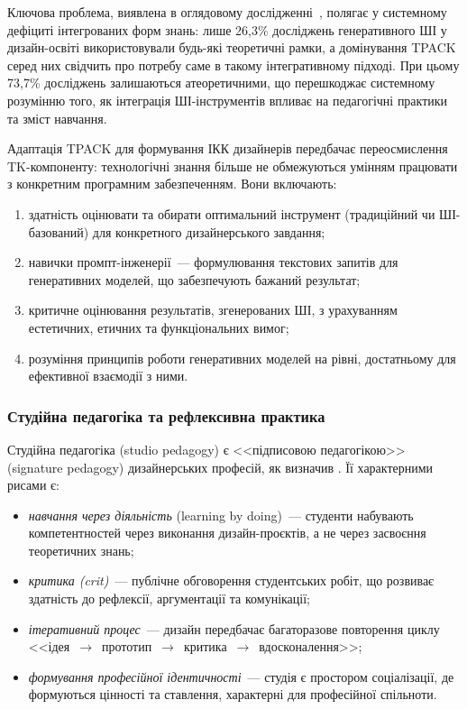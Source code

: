 Ключова проблема, виявлена в оглядовому дослідженні~\cite{Musiienko2026ScopingReview}, полягає у системному дефіциті інтегрованих форм знань: лише 26,3\% досліджень генеративного ШІ у дизайн-освіті використовували будь-які теоретичні рамки, а домінування TPACK серед них свідчить про потребу саме в такому інтегративному підході. При цьому 73,7\% досліджень залишаються атеоретичними, що перешкоджає системному розумінню того, як інтеграція ШІ-інструментів впливає на педагогічні практики та зміст навчання.

Адаптація TPACK для формування ІКК дизайнерів передбачає переосмислення TK-компоненту: технологічні знання більше не обмежуються умінням працювати з конкретним програмним забезпеченням. Вони включають:
\begin{enumerate}
    \item здатність оцінювати та обирати оптимальний інструмент (традиційний чи ШІ-базований) для конкретного дизайнерського завдання;
    \item навички промпт-інженерії~--- формулювання текстових запитів для генеративних моделей, що забезпечують бажаний результат;
    \item критичне оцінювання результатів, згенерованих ШІ, з урахуванням естетичних, етичних та функціональних вимог;
    \item розуміння принципів роботи генеративних моделей на рівні, достатньому для ефективної взаємодії з ними.
\end{enumerate}

\subsubsection{Студійна педагогіка та рефлексивна практика}\label{sssec:1.4.2}

Студійна педагогіка (studio pedagogy) є <<підписовою педагогікою>> (signature pedagogy) дизайнерських професій, як визначив \citet{Shulman2005}. Її характерними рисами є:

\begin{itemize}
    \item \textit{навчання через діяльність} (learning by doing)~--- студенти набувають компетентностей через виконання дизайн-проєктів, а не через засвоєння теоретичних знань;
    \item \textit{критика (crit)}~--- публічне обговорення студентських робіт, що розвиває здатність до рефлексії, аргументації та комунікації;
    \item \textit{ітеративний процес}~--- дизайн передбачає багаторазове повторення циклу <<ідея~$\to$~прототип~$\to$~критика~$\to$~вдосконалення>>;
    \item \textit{формування професійної ідентичності}~--- студія є простором соціалізації, де формуються цінності та ставлення, характерні для професійної спільноти.
\end{itemize}

